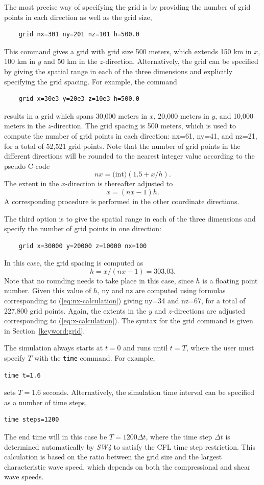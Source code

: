 \documentclass[11pt]{report}
\begin{document}
The most precise way of specifying the grid is by providing the number of grid points in each
direction as well as the grid size,
%
\begin{verbatim}
	grid nx=301 ny=201 nz=101 h=500.0 
\end{verbatim}
%
This command gives a grid with grid size 500 meters, which extends 150 km in $x$, 100 km in $y$ and
50 km in the $z$-direction. Alternatively, the grid can be specified by giving the spatial range in
each of the three dimensions and explicitly specifying the grid spacing. For example, the command
%
\begin{verbatim}
	grid x=30e3 y=20e3 z=10e3 h=500.0 
\end{verbatim}
%
results in a grid which spans 30,000 meters in $x$, 20,000 meters in $y$, and 10,000
meters in the $z$-direction.  The grid spacing is 500 meters, which is used to compute the
number of grid points in each direction: nx=61, ny=41, and nz=21, for a total of
52,521 grid points. Note that the number of grid points in the different directions will be
rounded to the nearest integer value according to the pseudo C-code
\begin{equation}\label{eq:nx-calculation}
nx = \mbox{(int)} (1.5 + x/h).
\end{equation}
The extent in the $x$-direction is thereafter adjusted to
\begin{equation}\label{eq:x-calculation}
x=(nx-1) h.
\end{equation}
A corresponding procedure is performed in the other coordinate directions.

The third option is to give the spatial range in each of the three dimensions and specify the number
of grid points in one direction:
%
\begin{verbatim}
	grid x=30000 y=20000 z=10000 nx=100
\end{verbatim}
%
In this case, the grid spacing is computed as 
\[
h = x/(nx-1)= 303.03.
\]
Note that no rounding needs to take place in this case, since $h$ is a floating point number. Given this
value of $h$, ny and nz are computed using formulas corresponding to
(\ref{eq:nx-calculation}) giving ny=34 and nz=67, for a total of 227,800 grid points. Again,
the extents in the $y$ and $z$-directions are adjusted corresponding to (\ref{eq:x-calculation}). The syntax
for the grid command is given in Section~\ref{keyword:grid}.

The simulation always starts at $t=0$ and runs until $t=T$, where the user must specify $T$ with the
{\tt time} command. For example,
\begin{verbatim}
time t=1.6
\end{verbatim}
sets $T=1.6$ seconds. Alternatively, the simulation time interval can be specified as 
a number of time steps,
\begin{verbatim}
time steps=1200
\end{verbatim}
The end time will in this case be $T=1200\Delta t$,
where the time step $\Delta t$ is determined automatically by \emph{SW4} to satisfy the CFL time
step restriction. This calculation is based on the ratio between the grid size and the largest
characteristic wave speed, which depends on both the compressional and shear wave speeds. 
\end{document}
